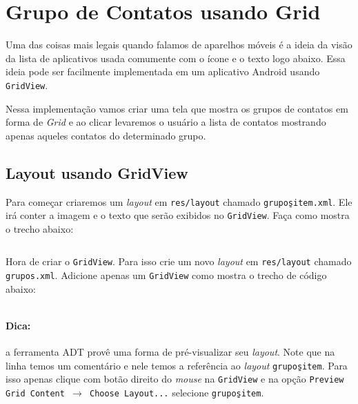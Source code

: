 \begin{listing}[H]
  \inputminted[linenos=true,frame=bottomline,tabsize=3]{ java }{ source/SalvarActivity-7.java }
  \caption{Obtem o valor padrão definido nas Preferências [SalvarActivity.java]}
\end{listing}

\section{Grupo de Contatos usando Grid}

Uma das coisas mais legais quando falamos de aparelhos móveis é a ideia da visão da lista de aplicativos
usada comumente com o ícone e o texto logo abaixo. Essa ideia pode ser facilmente implementada em
um aplicativo Android usando \texttt{GridView}.

Nessa implementação vamos criar uma tela que mostra os grupos de contatos em forma de \textit{Grid}
e ao clicar levaremos o usuário a lista de contatos mostrando apenas aqueles contatos do determinado
grupo.

\subsection{Layout usando GridView}

Para começar criaremos um \textit{layout} em \texttt{res/layout} chamado \texttt{grupos\b{ }item.xml}.
Ele irá conter a imagem e o texto que serão exibidos no \texttt{GridView}. Faça como mostra o trecho abaixo:

\begin{listing}[H]
  \inputminted[linenos=true,frame=bottomline,tabsize=3]{ xml }{ source/grupos_item-1.xml }
  \caption{Item do Layout de Grupos [res/layout/grupos\b{ }item.xml]}
\end{listing}

Hora de criar o \texttt{GridView}. Para isso crie um novo \textit{layout} em \texttt{res/layout} chamado
\texttt{grupos.xml}. Adicione apenas um \texttt{GridView} como mostra o trecho de código abaixo:

\begin{listing}[H]
  \inputminted[linenos=true,frame=bottomline,tabsize=3]{ xml }{ source/grupos-1.xml }
  \caption{Layout de Grupos [res/layout/grupos.xml]}
\end{listing}

\paragraph{Dica:} a ferramenta ADT provê uma forma de pré-visualizar seu \textit{layout}. Note que
na linha  temos um comentário e nele temos a referência ao \textit{layout}
\texttt{grupos\b{ }item}. Para isso apenas clique com botão direito do \textit{mouse} na \texttt{GridView}
e na opção \texttt{Preview Grid Content $\rightarrow$ Choose Layout...} selecione \texttt{grupos\b{ }item}.

